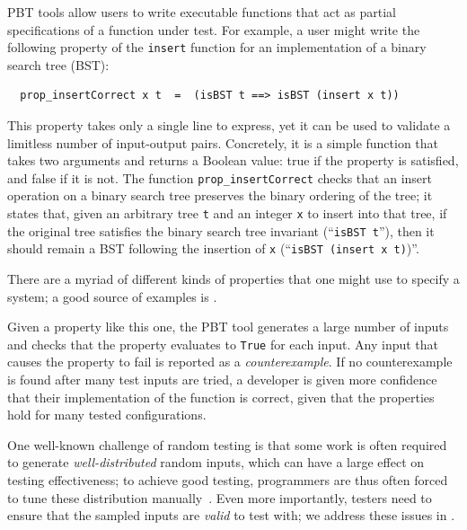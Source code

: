 PBT tools allow users to write executable functions
that act as partial
specifications of a function under test. For example, a user might
write the following property of the \lstinline{insert}
function for an implementation of a binary search tree (BST):
\begin{lstlisting}
  prop_insertCorrect x t  =  (isBST t ==> isBST (insert x t))
\end{lstlisting}
This property takes only a single
line to express, yet it can be used to validate a limitless number of
input-output pairs. Concretely, it is
a simple function that takes two arguments and returns a
Boolean value: true if the property is satisfied, and false if it is
not. The function \texttt{prop\_insertCorrect} checks
that an insert operation on a binary search tree preserves the
binary ordering of the tree; it states
that, given an arbitrary tree \texttt{t} and an integer
\texttt{x} to insert into that tree, if the original tree
satisfies the
binary search tree invariant (``\texttt{isBST t}''), then it should remain
a BST following the insertion of \texttt{x} (``\texttt{isBST (insert x t)})''.

\iflater {}There are a
myriad of different kinds of properties that one might use to specify
a system; a good source of examples is \citet{HowToSpecifyIt}.  \fi

Given a property like this one, the PBT tool generates a large number of inputs and
checks that the property evaluates to \lstinline{True} for each input.
Any input that causes the property to fail is reported as a {\em
counterexample}. If no counterexample is found after many test
inputs are tried, a developer is given more confidence that their implementation
of the function is correct, given that the properties hold for many
tested configurations.


One well-known challenge of random testing is that some work is often
required to generate {\em well-distributed} random inputs, which can
have a large effect on testing effectiveness; to achieve good testing,
programmers are thus often forced to tune these distribution
manually~\cite{DBLP:conf/icfp/ClaessenH00}. Even more importantly,
testers need to ensure that the sampled inputs are {\em valid} to test
with; we address these issues in .

